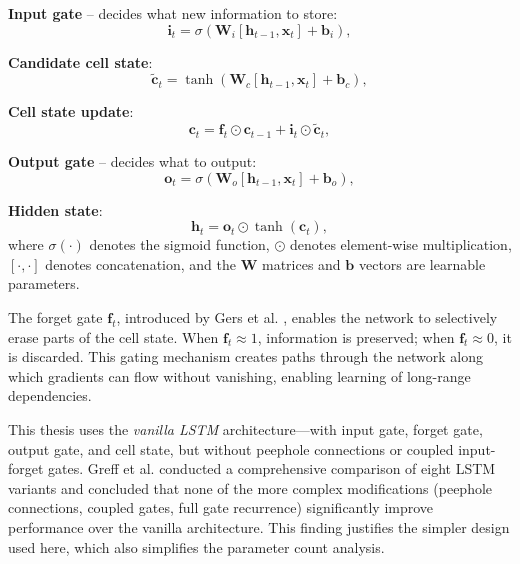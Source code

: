 \textbf{Input gate} -- decides what new information to store:
\begin{equation}
    \mathbf{i}_t = \sigma(\mathbf{W}_i [\mathbf{h}_{t-1}, \mathbf{x}_t] + \mathbf{b}_i),
    \label{eq:input_gate}
\end{equation}

\textbf{Candidate cell state}:
\begin{equation}
    \tilde{\mathbf{c}}_t = \tanh(\mathbf{W}_c [\mathbf{h}_{t-1}, \mathbf{x}_t] + \mathbf{b}_c),
    \label{eq:candidate}
\end{equation}

\textbf{Cell state update}:
\begin{equation}
    \mathbf{c}_t = \mathbf{f}_t \odot \mathbf{c}_{t-1} + \mathbf{i}_t \odot \tilde{\mathbf{c}}_t,
    \label{eq:cell_update}
\end{equation}

\textbf{Output gate} -- decides what to output:
\begin{equation}
    \mathbf{o}_t = \sigma(\mathbf{W}_o [\mathbf{h}_{t-1}, \mathbf{x}_t] + \mathbf{b}_o),
    \label{eq:output_gate}
\end{equation}

\textbf{Hidden state}:
\begin{equation}
    \mathbf{h}_t = \mathbf{o}_t \odot \tanh(\mathbf{c}_t),
    \label{eq:hidden}
\end{equation}
where $\sigma(\cdot)$ denotes the sigmoid function, $\odot$ denotes element-wise multiplication, $[\cdot, \cdot]$ denotes concatenation, and the $\mathbf{W}$ matrices and $\mathbf{b}$ vectors are learnable parameters.

The forget gate $\mathbf{f}_t$, introduced by Gers et al. \cite{gers2000learning}, enables the network to selectively erase parts of the cell state. When $\mathbf{f}_t \approx 1$, information is preserved; when $\mathbf{f}_t \approx 0$, it is discarded. This gating mechanism creates paths through the network along which gradients can flow without vanishing, enabling learning of long-range dependencies.

This thesis uses the \emph{vanilla LSTM} architecture---with input gate, forget gate, output gate, and cell state, but without peephole connections or coupled input-forget gates. Greff et al. \cite{greff2017lstm} conducted a comprehensive comparison of eight LSTM variants and concluded that none of the more complex modifications (peephole connections, coupled gates, full gate recurrence) significantly improve performance over the vanilla architecture. This finding justifies the simpler design used here, which also simplifies the parameter count analysis.

